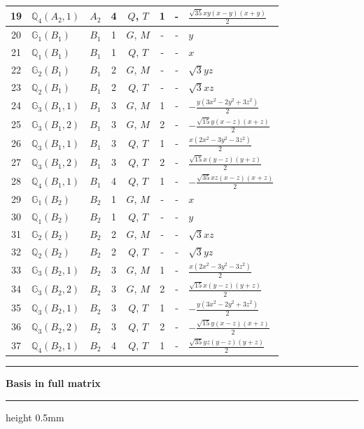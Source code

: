 \documentclass[fleqn,10pt,landscape]{jsarticle}
\begin{document}
\begin{longtable}[l]{clcccccl}
19 & $\mathbb{Q}_{4}(A_{2},1)$ & $A_{2}$ & 4 & $Q$, $T$ & 1 & - & $\frac{\sqrt{35} x y \left(x - y\right) \left(x + y\right)}{2}$ \\ \hline
20 & $\mathbb{G}_{1}(B_{1})$ & $B_{1}$ & 1 & $G$, $M$ & - & - & $y$ \\ \hline
21 & $\mathbb{Q}_{1}(B_{1})$ & $B_{1}$ & 1 & $Q$, $T$ & - & - & $x$ \\ \hline
22 & $\mathbb{G}_{2}(B_{1})$ & $B_{1}$ & 2 & $G$, $M$ & - & - & $\sqrt{3} y z$ \\ \hline
23 & $\mathbb{Q}_{2}(B_{1})$ & $B_{1}$ & 2 & $Q$, $T$ & - & - & $\sqrt{3} x z$ \\ \hline
24 & $\mathbb{G}_{3}(B_{1},1)$ & $B_{1}$ & 3 & $G$, $M$ & 1 & - & $- \frac{y \left(3 x^{2} - 2 y^{2} + 3 z^{2}\right)}{2}$ \\ \hline
25 & $\mathbb{G}_{3}(B_{1},2)$ & $B_{1}$ & 3 & $G$, $M$ & 2 & - & $- \frac{\sqrt{15} y \left(x - z\right) \left(x + z\right)}{2}$ \\ \hline
26 & $\mathbb{Q}_{3}(B_{1},1)$ & $B_{1}$ & 3 & $Q$, $T$ & 1 & - & $\frac{x \left(2 x^{2} - 3 y^{2} - 3 z^{2}\right)}{2}$ \\ \hline
27 & $\mathbb{Q}_{3}(B_{1},2)$ & $B_{1}$ & 3 & $Q$, $T$ & 2 & - & $\frac{\sqrt{15} x \left(y - z\right) \left(y + z\right)}{2}$ \\ \hline
28 & $\mathbb{Q}_{4}(B_{1},1)$ & $B_{1}$ & 4 & $Q$, $T$ & 1 & - & $- \frac{\sqrt{35} x z \left(x - z\right) \left(x + z\right)}{2}$ \\ \hline
29 & $\mathbb{G}_{1}(B_{2})$ & $B_{2}$ & 1 & $G$, $M$ & - & - & $x$ \\ \hline
30 & $\mathbb{Q}_{1}(B_{2})$ & $B_{2}$ & 1 & $Q$, $T$ & - & - & $y$ \\ \hline
31 & $\mathbb{G}_{2}(B_{2})$ & $B_{2}$ & 2 & $G$, $M$ & - & - & $\sqrt{3} x z$ \\ \hline
32 & $\mathbb{Q}_{2}(B_{2})$ & $B_{2}$ & 2 & $Q$, $T$ & - & - & $\sqrt{3} y z$ \\ \hline
33 & $\mathbb{G}_{3}(B_{2},1)$ & $B_{2}$ & 3 & $G$, $M$ & 1 & - & $\frac{x \left(2 x^{2} - 3 y^{2} - 3 z^{2}\right)}{2}$ \\ \hline
34 & $\mathbb{G}_{3}(B_{2},2)$ & $B_{2}$ & 3 & $G$, $M$ & 2 & - & $\frac{\sqrt{15} x \left(y - z\right) \left(y + z\right)}{2}$ \\ \hline
35 & $\mathbb{Q}_{3}(B_{2},1)$ & $B_{2}$ & 3 & $Q$, $T$ & 1 & - & $- \frac{y \left(3 x^{2} - 2 y^{2} + 3 z^{2}\right)}{2}$ \\ \hline
36 & $\mathbb{Q}_{3}(B_{2},2)$ & $B_{2}$ & 3 & $Q$, $T$ & 2 & - & $- \frac{\sqrt{15} y \left(x - z\right) \left(x + z\right)}{2}$ \\ \hline
37 & $\mathbb{Q}_{4}(B_{2},1)$ & $B_{2}$ & 4 & $Q$, $T$ & 1 & - & $\frac{\sqrt{35} y z \left(y - z\right) \left(y + z\right)}{2}$ \\
\end{longtable}
\vspace{5mm}
\noindent \rule[0.5mm]{5mm}{0.5mm}\hspace{3mm}\textbf{Basis in full matrix}\hspace{3mm}\leaders\hrule height 0.5mm\hfill\kern0pt
\vspace{3mm}
\end{document}
